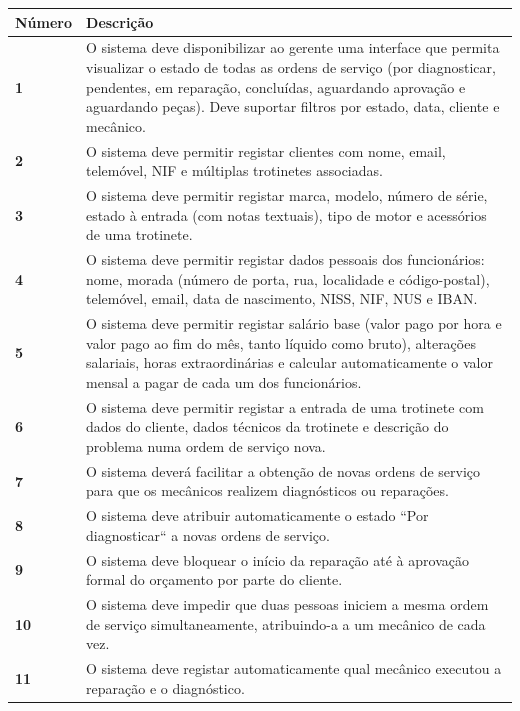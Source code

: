 \documentclass[11pt,a4paper]{article}
\begin{document}
	\begin{tabularx}{\textwidth}{@{}|l|X|@{}}
		\hline
		\rowcolor{gray!10} \textbf{Número} & \textbf{Descrição} \\ \hline
		\textbf{1} & O sistema deve disponibilizar ao gerente uma interface que permita visualizar o estado de todas as ordens de serviço (por diagnosticar, pendentes, em reparação, concluídas, aguardando aprovação e aguardando peças). Deve suportar filtros por estado, data, cliente e mecânico. \\ \hline
		\textbf{2}  & O sistema deve permitir registar clientes com nome, email, telemóvel, NIF e múltiplas trotinetes associadas. \\ \hline
		\textbf{3}  & O sistema deve permitir registar marca, modelo, número de série, estado à entrada (com notas textuais), tipo de motor e acessórios de uma trotinete. \\ \hline
		\textbf{4}  & O sistema deve permitir registar dados pessoais dos funcionários: nome, morada (número de porta, rua, localidade e código-postal), telemóvel, email, data de nascimento, NISS, NIF, NUS e IBAN. \\ \hline
		\textbf{5}  & O sistema deve permitir registar salário base (valor pago por hora e valor pago ao fim do mês, tanto líquido como bruto), alterações salariais, horas extraordinárias e calcular automaticamente o valor mensal a pagar de cada um dos funcionários. \\ \hline
		\textbf{6}  & O sistema deve permitir registar a entrada de uma trotinete com dados do cliente, dados técnicos da trotinete e descrição do problema numa ordem de serviço nova. \\ \hline
		\textbf{7}  & O sistema deverá facilitar a obtenção de novas ordens de serviço para que os mecânicos realizem diagnósticos ou reparações. \\ \hline
		\textbf{8}  & O sistema deve atribuir automaticamente o estado ``Por diagnosticar`` a novas ordens de serviço. \\ \hline
		\textbf{9}  & O sistema deve bloquear o início da reparação até à aprovação formal do orçamento por parte do cliente. \\ \hline
		\textbf{10}  & O sistema deve impedir que duas pessoas iniciem a mesma ordem de serviço simultaneamente, atribuindo-a a um mecânico de cada vez. \\ \hline
		\textbf{11}  & O sistema deve registar automaticamente qual mecânico executou a reparação e o diagnóstico. \\ \hline

\end{tabularx}
\end{document}
